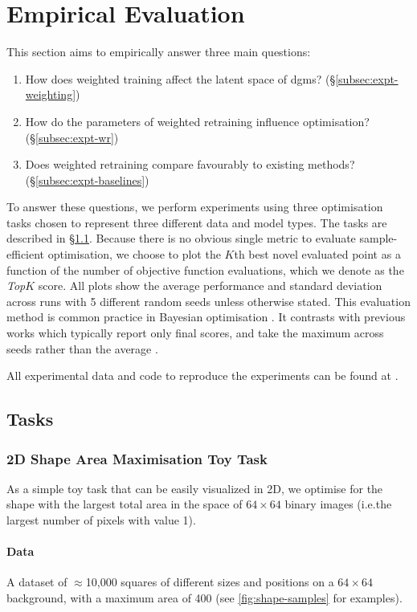 \section{Empirical Evaluation}
\label{sec:lso:experiments}
This section aims to empirically answer three main questions:
\begin{enumerate}
    \item How does weighted training affect the latent space of \glspl{dgm}? (\S\ref{subsec:expt-weighting})
    \item How do the parameters of weighted retraining influence optimisation? (\S\ref{subsec:expt-wr})
    \item Does weighted retraining compare favourably to existing methods? (\S\ref{subsec:expt-baselines})
\end{enumerate}
To answer these questions, we perform experiments using three optimisation tasks 
chosen to represent three different data and model types.
The tasks are described in \S\ref{sec:lso:expt-tasks}.
Because there is no obvious single metric to evaluate sample-efficient optimisation,
we choose to plot the $K$th best novel evaluated point as a function of the number of objective function evaluations,
which we denote as the \emph{Top$K$} score.
All plots show the average performance and standard deviation across runs with 5 different random seeds unless otherwise stated.
This evaluation method is common practice in Bayesian optimisation \citep{shahriari2015taking}.
It contrasts with previous works which typically report only final scores,
and take the maximum across seeds rather than the average
\citep{gomez2018,kusner_grammar_2017,dai_syntax-directed_2018,jin_junction_2019}.

All experimental data and code to reproduce the experiments can be found at 
\codelink{}.

\subsection{Tasks}
\label{sec:lso:expt-tasks}

\subsubsection{2D Shape Area Maximisation Toy Task}
As a simple toy task that can be easily visualized in 2D,
we optimise for the shape with the largest total area in the space of $64\times64$ binary images
(i.e.\@ the largest number of pixels with value 1).

\paragraph{Data} A dataset of $\approx$10,000 squares of different sizes and positions
on a $64\times64$ background, with a maximum area of 400
(see \cref{fig:shape-samples} for examples).
